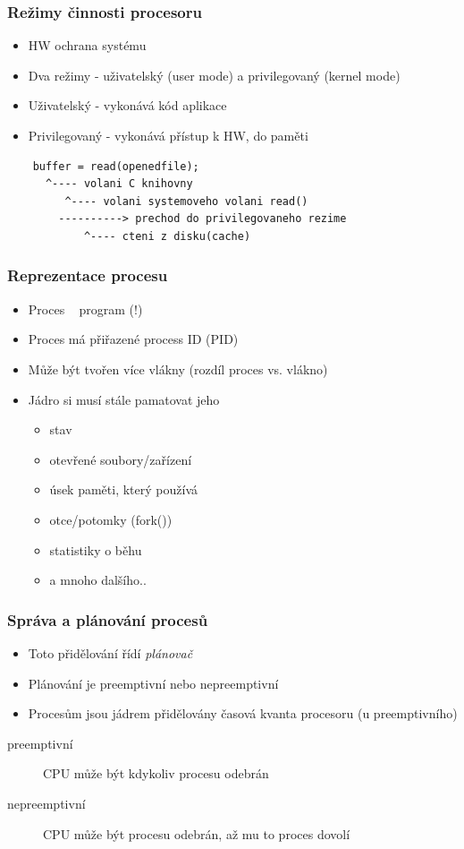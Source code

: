 \documentclass[professionalfonts,svgnames]{beamer}
\begin{document}
\begin{frame}[fragile]
\frametitle{Režimy činnosti procesoru}
\begin{itemize} %
	\item HW ochrana systému
	\item Dva režimy - uživatelský (user mode) a privilegovaný (kernel mode)
\end{itemize}
\begin{itemize}
	\item Uživatelský - vykonává kód aplikace
	\item Privilegovaný - vykonává přístup k HW, do paměti
\end{itemize}
\begin{verbatim}
	buffer = read(openedfile);
	  ^---- volani C knihovny
	     ^---- volani systemoveho volani read()
		----------> prechod do privilegovaneho rezime
	        ^---- cteni z disku(cache)
\end{verbatim}
\end{frame}

\begin{frame}
\frametitle{Reprezentace procesu}
\begin{itemize} %
	\item Proces ~ program (!)
	\item Proces má přiřazené process ID (PID)
	\item Může být tvořen více vlákny (rozdíl proces vs. vlákno)
	\item Jádro si musí stále pamatovat jeho
	\begin{itemize}
		\item stav
		\item otevřené soubory/zařízení
		\item úsek paměti, který používá
		\item otce/potomky (fork())
		\item statistiky o běhu
		\item a mnoho dalšího..
	\end{itemize}
\end{itemize}
\end{frame}

\begin{frame}
\frametitle{Správa a plánování procesů}
\begin{itemize} %
	\item Toto přidělování řídí \textit{plánovač}
	\item Plánování je preemptivní nebo nepreemptivní
	\item Procesům jsou jádrem přidělovány časová kvanta procesoru (u
		preemptivního)
\end{itemize}
\begin{description}
	\item[preemptivní] CPU může být kdykoliv procesu odebrán
	\item[nepreemptivní] CPU může být procesu odebrán, až mu to proces dovolí
\end{description}
\end{frame}
\end{document}
